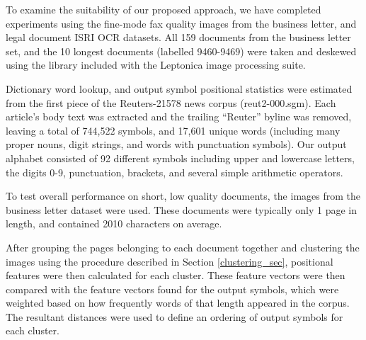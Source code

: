\documentclass[times, 10pt,twocolumn]{article}
\begin{document}

To examine the suitability of our proposed approach, we have completed
experiments using the fine-mode fax quality images from the business letter, 
and legal document ISRI OCR datasets\cite{nartker2005}.  All 159 documents from
the business letter set, and the 10 longest documents (labelled 9460-9469) were
taken and deskewed using the library included with the Leptonica image
processing suite\cite{bloomberg2006}.

Dictionary word lookup, and output symbol positional statistics were estimated
from the first piece of the Reuters-21578 news corpus 
(reut2-000.sgm)\cite{lewis2004}.  Each article's body text was extracted and the
trailing ``Reuter'' byline was removed, leaving a total of 744,522 symbols, and
17,601 unique words (including many proper nouns, digit strings, and words with
punctuation symbols).  Our output alphabet consisted of 92 different symbols
including upper and lowercase letters, the digits 0-9, punctuation, brackets, 
and several simple arithmetic operators.

%
%
%

To test overall performance on short, low quality documents, the images from
the business letter dataset were used.  These documents were typically only 1
page in length, and contained 2010 characters on average.

After grouping the pages belonging to each document together and clustering 
the images using the procedure described in Section \ref{clustering_sec}, 
positional features were then calculated for each cluster.  These feature 
vectors were then compared with the feature vectors found for the output 
symbols, which were weighted based on how frequently words of that length 
appeared in the corpus.  The resultant distances were used to define an 
ordering of output symbols for each cluster.
\end{document}

